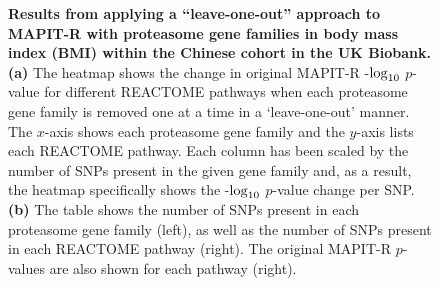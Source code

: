 \documentclass[10pt]{article}
\def\log{{\rm log}}
\begin{document}
\begin{figure}[H]
\caption{\textbf{Results from applying a ``leave-one-out'' approach to MAPIT-R with proteasome gene families in body mass index (BMI) within the Chinese cohort in the UK Biobank.} \textbf{(a)} The heatmap shows the change in original MAPIT-R -$\log_{10}$ $p$-value for different REACTOME pathways when each proteasome gene family is removed one at a time in a `leave-one-out' manner. The $x$-axis shows each proteasome gene family and the $y$-axis lists each REACTOME pathway. Each column has been scaled by the number of SNPs present in the given gene family and, as a result, the heatmap specifically shows the -$\log_{10}$ $p$-value change per SNP. \textbf{(b)} The table shows the number of SNPs present in each proteasome gene family (left), as well as the number of SNPs present in each REACTOME pathway (right). The original MAPIT-R $p$-values are also shown for each pathway (right).}
\label{InterPath-Supp-Figure-Prot-Heatplots-Chinese}
\end{figure}
\clearpage

\end{document}
